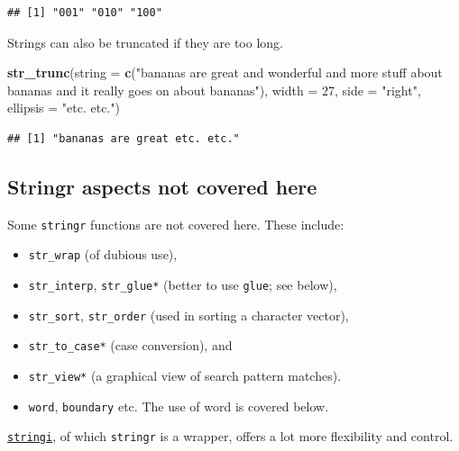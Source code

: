 \documentclass[]{book}
\newenvironment{Shaded}{}{}
\newcommand{\DataTypeTok}[1]{\textcolor[rgb]{0.56,0.13,0.00}{#1}}
\newcommand{\DecValTok}[1]{\textcolor[rgb]{0.25,0.63,0.44}{#1}}
\newcommand{\KeywordTok}[1]{\textcolor[rgb]{0.00,0.44,0.13}{\textbf{#1}}}
\newcommand{\NormalTok}[1]{#1}
\newcommand{\StringTok}[1]{\textcolor[rgb]{0.25,0.44,0.63}{#1}}
\begin{document}
\begin{verbatim}
## [1] "001" "010" "100"
\end{verbatim}

Strings can also be truncated if they are too long.

\begin{Shaded}
\begin{Highlighting}[]
\KeywordTok{str_trunc}\NormalTok{(}\DataTypeTok{string =} \KeywordTok{c}\NormalTok{(}\StringTok{"bananas are great and wonderful}
\StringTok{                     and more stuff about bananas and}
\StringTok{                     it really goes on about bananas"}\NormalTok{),}
          \DataTypeTok{width =} \DecValTok{27}\NormalTok{,}
          \DataTypeTok{side =} \StringTok{"right"}\NormalTok{, }\DataTypeTok{ellipsis =} \StringTok{"etc. etc."}\NormalTok{)}
\end{Highlighting}
\end{Shaded}

\begin{verbatim}
## [1] "bananas are great etc. etc."
\end{verbatim}

\hypertarget{stringr-aspects-not-covered-here}{%
\subsection{Stringr aspects not covered here}\label{stringr-aspects-not-covered-here}}

Some \texttt{stringr} functions are not covered here. These include:

\begin{itemize}
\item
  \texttt{str\_wrap} (of dubious use),
\item
  \texttt{str\_interp}, \texttt{str\_glue*} (better to use \texttt{glue}; see below),
\item
  \texttt{str\_sort}, \texttt{str\_order} (used in sorting a character vector),
\item
  \texttt{str\_to\_case*} (case conversion), and
\item
  \texttt{str\_view*} (a graphical view of search pattern matches).
\item
  \texttt{word}, \texttt{boundary} etc. The use of word is covered below.
\end{itemize}

\href{https://cran.r-project.org/web/packages/stringi/}{\texttt{stringi}}, of which \texttt{stringr} is a wrapper, offers a lot more flexibility and control.
\end{document}
